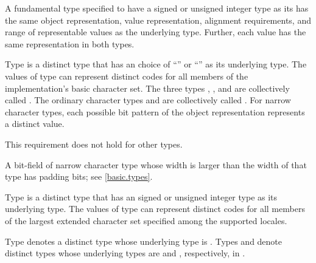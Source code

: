 \pnum
{}%
A fundamental type specified to have
a signed or unsigned integer type as its  has
the same object representation,
value representation,
alignment requirements, and
range of representable values as the underlying type.
Further, each value has the same representation in both types.

\pnum
{}%
%
%
%
%
%
%
%
Type  is a distinct type
that has an  choice of
``'' or ``'' as its underlying type.
The values of type  can represent distinct codes
for all members of the implementation's basic character set.
The three types , , and 
are collectively called
.
The ordinary character types and 
are collectively called .
For narrow character types,
each possible bit pattern of the object representation represents
a distinct value.
\begin{note}
This requirement does not hold for other types.
\end{note}
\begin{note}
A bit-field of narrow character type whose width is larger than
the width of that type has padding bits; see \ref{basic.types}.
\end{note}

\pnum
{}%
%
%
Type  is a distinct type that has
an 
signed or unsigned integer type as its underlying type.
The values of type  can represent
distinct codes for all members of the largest extended character set
specified among the supported locales.

\pnum
{}%
%
%
Type  denotes a distinct type
whose underlying type is .
%
%
%
%
%
%
Types  and  denote distinct types
whose underlying types are  and ,
respectively, in .


